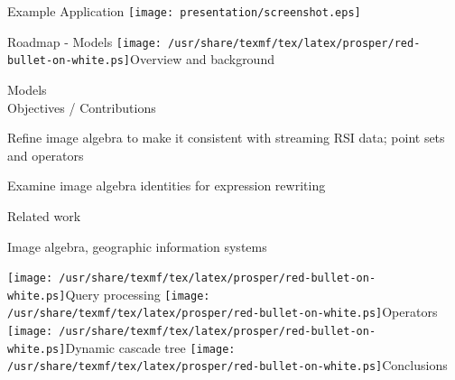 \documentclass[final,total,bgColor,slideColor,pdf,ps2pdf,default,noaccumulate]{prosper}
\newcommand{\ii}{\texttt{[image: /usr/share/texmf/tex/latex/prosper/red-bullet-on-white.ps]}}
\begin{document}
\begin{slide}[R]{Example Application}
  \texttt{[image: presentation/screenshot.eps]}
\end{slide}


\begin{slide}{Roadmap - Models}
  { \tiny \ii Overview and background }
    \begin{Itemize}
  \item Models \\ {\blue Objectives / Contributions }
    \begin{Itemize}
    \item Refine image algebra to make it consistent with streaming
      RSI data; point sets and operators
    \item Examine image algebra identities for expression rewriting
    \end{Itemize}
  {\blue Related work }
    \begin{Itemize}
    \item Image algebra, geographic information systems
    \end{Itemize}
  \end{Itemize}
  { \tiny \ii Query processing \ii Operators \ii Dynamic cascade tree \ii Conclusions }
\end{slide}
\end{document}
